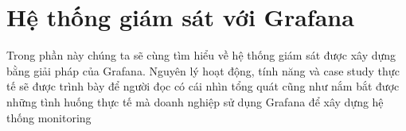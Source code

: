 \chapter{Hệ thống giám sát với Grafana}
Trong phần này chúng ta sẽ cùng tìm hiểu về hệ thống giám sát được xây dựng bằng giải pháp của Grafana. Nguyên lý hoạt động, tính năng và case study thực tế sẽ được trình bày để người đọc có cái nhìn tổng quát cũng như nắm bắt được những tình huống thực tế mà doanh nghiệp sử dụng Grafana để xây dựng hệ thống monitoring


